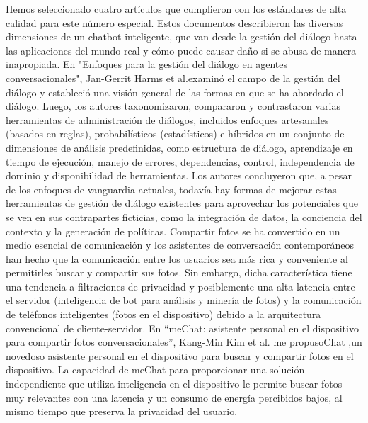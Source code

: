 Hemos seleccionado cuatro artículos que cumplieron con los estándares de alta calidad para este número especial. Estos documentos describieron las diversas dimensiones de un chatbot inteligente, que van desde la gestión del diálogo hasta las aplicaciones del mundo real y cómo puede causar daño si se abusa de manera inapropiada.
En "Enfoques para la gestión del diálogo en agentes conversacionales", Jan-Gerrit Harms et al.examinó el campo de la gestión del diálogo y estableció una visión general de las formas en que se ha abordado el diálogo. Luego, los autores taxonomizaron, compararon y contrastaron varias herramientas de administración de diálogos, incluidos enfoques artesanales (basados en reglas), probabilísticos (estadísticos) e híbridos en un conjunto de dimensiones de análisis predefinidas, como estructura de diálogo, aprendizaje en tiempo de ejecución, manejo de errores, dependencias, control, independencia de dominio y disponibilidad de herramientas. Los autores concluyeron que, a pesar de los enfoques de vanguardia actuales, todavía hay formas de mejorar estas herramientas de gestión de diálogo existentes para aprovechar los potenciales que se ven en sus contrapartes ficticias, como la integración de datos, la conciencia del contexto y la generación de políticas.
Compartir fotos se ha convertido en un medio esencial de comunicación y los asistentes de conversación contemporáneos han hecho que la comunicación entre los usuarios sea más rica y conveniente al permitirles buscar y compartir sus fotos. Sin embargo, dicha característica tiene una tendencia a filtraciones de privacidad y posiblemente una alta latencia entre el servidor (inteligencia de bot para análisis y minería de fotos) y la comunicación de teléfonos inteligentes (fotos en el dispositivo) debido a la arquitectura convencional de cliente-servidor. En “meChat: asistente personal en el dispositivo para compartir fotos conversacionales”, Kang-Min Kim et al. me propusoChat ,un novedoso asistente personal en el dispositivo para buscar y compartir fotos en el dispositivo. La capacidad de meChat para proporcionar una solución independiente que utiliza inteligencia en el dispositivo le permite buscar fotos muy relevantes con una latencia y un consumo de energía percibidos bajos, al mismo tiempo que preserva la privacidad del usuario.
